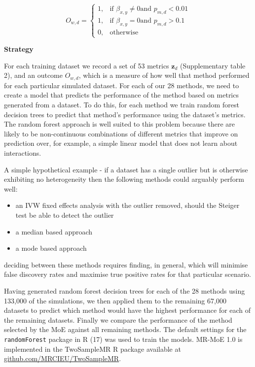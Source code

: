 \documentclass[]{article}
\providecommand{\tightlist}{%
  \setlength{\itemsep}{0pt}\setlength{\parskip}{0pt}}
\begin{document}
\[
    O_{w,d} = 
\begin{cases}
    1,   & \text{if } \beta_{x,y} \neq 0 \text{and } p_{m,d} < 0.01\\
    1,   & \text{if } \beta_{x,y} = 0 \text{and } p_{m,d} > 0.1 \\
    0,   & \text{otherwise}
\end{cases}
\]

\textbf{Strategy}

For each training dataset we record a set of 53 metrics
\(\textbf{z}_{d}\) (Supplementary table 2), and an outcome \(O_{w,d}\),
which is a measure of how well that method performed for each particular
simulated dataset. For each of our 28 methods, we need to create a model
that predicts the performance of the method based on metrics generated
from a dataset. To do this, for each method we train random forest
decision trees to predict that method's performance using the dataset's
metrics. The random forest approach is well suited to this problem
because there are likely to be non-continuous combinations of different
metrics that improve on prediction over, for example, a simple linear
model that does not learn about interactions.

A simple hypothetical example - if a dataset has a single outlier but is
otherwise exhibiting no heterogeneity then the following methods could
arguably perform well:

\begin{itemize}
\tightlist
\item
  an IVW fixed effects analysis with the outlier removed, should the
  Steiger test be able to detect the outlier
\item
  a median based approach
\item
  a mode based approach
\end{itemize}

deciding between these methods requires finding, in general, which will
minimise false discovery rates and maximise true positive rates for that
particular scenario.

Having generated random forest decision trees for each of the 28 methods
using 133,000 of the simulations, we then applied them to the remaining
67,000 datasets to predict which method would have the highest
performance for each of the remaining datasets. Finally we compare the
performance of the method selected by the MoE against all remaining
methods. The default settings for the \texttt{randomForest} package in R
(17) was used to train the models. MR-MoE 1.0 is implemented in the
TwoSampleMR R package available at
\href{https://github.com/MRCIEU/TwoSampleMR}{github.com/MRCIEU/TwoSampleMR}.
\end{document}
